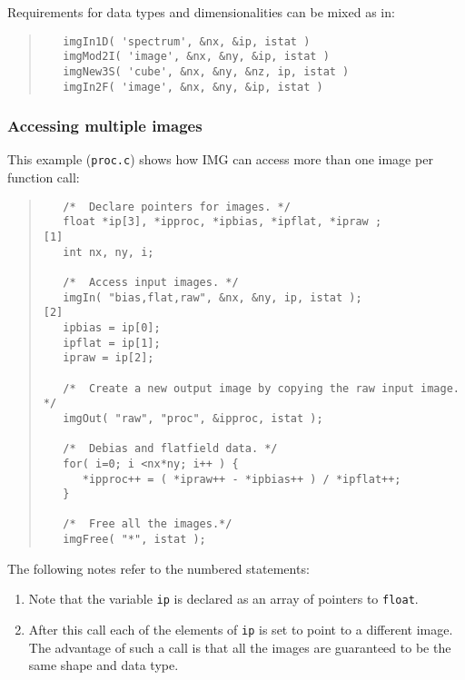 \documentclass[twoside,11pt]{article}
\newcommand{\htmladdnormallink}[2]{#1}
\renewcommand{\_}{\texttt{\symbol{95}}}
\newcommand{\myverb}[1]{{\texttt{#1}}}
\newcommand{\mynote}{The following notes refer to the numbered statements:}
\newenvironment{code}{\begin{small} \begin{quote}}
                     {\end{quote} \end{small}}
\newenvironment{enumnotes}
{
   \renewcommand{\labelenumi}{\myverb{[\theenumi]}}
   \begin{enumerate}
}{
   \end{enumerate}
   \renewcommand{\labelenumi}{\theenumi}
}
\renewenvironment{enumnotes}
  {
    \begin{enumerate}
  }{
    \end{enumerate}
  }
\begin{document}
Requirements for data types and dimensionalities can be mixed as in:
\begin{code}
\begin{verbatim}
   imgIn1D( 'spectrum', &nx, &ip, istat )
   imgMod2I( 'image', &nx, &ny, &ip, istat )
   imgNew3S( 'cube', &nx, &ny, &nz, ip, istat )
   imgIn2F( 'image', &nx, &ny, &ip, istat )
\end{verbatim}
\end{code}

\subsubsection{Accessing multiple images}
This example
(\htmladdnormallink{\myverb{proc.c}}{../../bin/examples/img/proc.c})
shows how IMG can access more than one image per function call:
\begin{code}
\begin{verbatim}
   /*  Declare pointers for images. */
   float *ip[3], *ipproc, *ipbias, *ipflat, *ipraw ;              [1]
   int nx, ny, i;

   /*  Access input images. */
   imgIn( "bias,flat,raw", &nx, &ny, ip, istat );                 [2]
   ipbias = ip[0];
   ipflat = ip[1];
   ipraw = ip[2];

   /*  Create a new output image by copying the raw input image. */
   imgOut( "raw", "proc", &ipproc, istat );

   /*  Debias and flatfield data. */
   for( i=0; i <nx*ny; i++ ) {
      *ipproc++ = ( *ipraw++ - *ipbias++ ) / *ipflat++;
   }

   /*  Free all the images.*/
   imgFree( "*", istat );
\end{verbatim}
\end{code}
\mynote
\begin{enumnotes}
\item Note that the variable \myverb{ip} is declared as an array of
pointers to \myverb{float}.
\item After this call each of the elements of \myverb{ip} is set to
point to a different image. The advantage of such a call is that all
the images are guaranteed to be the same shape and data type.
\end{enumnotes}
\end{document}
